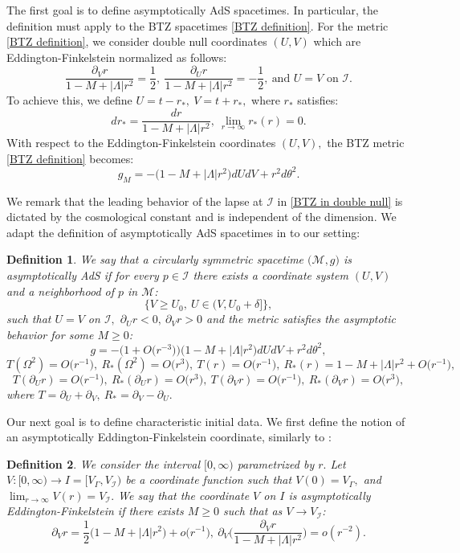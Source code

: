 \documentclass[11pt]{article}
\newtheorem{definition}{Definition}[section]
\numberwithin{equation}{section}
\begin{document}
The first goal is to define asymptotically AdS spacetimes. In particular, the definition must apply to the BTZ spacetimes \eqref{BTZ definition}. For the metric \eqref{BTZ definition}, we consider double null coordinates $(U,V)$ which are Eddington-Finkelstein normalized as follows:
\[\frac{\partial_Vr}{1-M+|\Lambda|r^2}=\frac{1}{2},\ \frac{\partial_Ur}{1-M+|\Lambda|r^2}=-\frac{1}{2},\ \text{and }U=V\text{ on }\mathcal{I}.\]
To achieve this, we define $U=t-r_*,\ V=t+r_*,$ where $r_*$ satisfies:
\[dr_*=\frac{dr}{1-M+|\Lambda|r^2},\ \lim_{r\rightarrow\infty}r_*(r)=0.\]
With respect to the Eddington-Finkelstein coordinates $(U,V),$ the BTZ metric \eqref{BTZ definition} becomes:
\begin{equation}\label{BTZ in double null}
    g_M=-\Big(1-M+|\Lambda|r^2\Big)dUdV+r^2d\theta^2.
\end{equation}

We remark that the leading behavior of the lapse at $\mathcal{I}$ in \eqref{BTZ in double null} is dictated by the cosmological constant and is independent of the dimension. We adapt the definition of asymptotically AdS spacetimes in \cite[Section~2.4]{localwellposed} to our setting:
\begin{definition}\label{asympt ads def}
    We say that a circularly symmetric spacetime $\big(\mathcal{M},g\big)$ is asymptotically AdS if for every $p\in\mathcal{I}$ there exists a coordinate system $(U,V)$ and a neighborhood of $p$ in $\mathcal{M}$:
    \[\Big\{V\geq U_0,\ U\in(V,U_0+\delta]\Big\},\]
    such that $U=V$ on $\mathcal{I},$ $\partial_Ur<0,\ \partial_Vr>0$ and the metric satisfies the asymptotic behavior for some $M\geq0$:
    \[g=-\Big(1+O\big(r^{-3}\big)\Big)\Big(1-M+|\Lambda|r^2\Big)dUdV+r^2d\theta^2,\]
    \[T(\Omega^2)=O\big(r^{-1}\big),\ R_*(\Omega^2)=O\big(r^{3}\big),\ T(r)=O\big(r^{-1}\big),\ R_*(r)=1-M+|\Lambda|r^2+O\big(r^{-1}\big),\]
    \[T(\partial_Ur)=O\big(r^{-1}\big),\ R_*(\partial_Ur)=O\big(r^{3}\big),\ T(\partial_Vr)=O\big(r^{-1}\big),\ R_*(\partial_Vr)=O\big(r^{3}\big),\]
    where $T=\partial_U+\partial_V,\ R_*=\partial_V-\partial_U.$
\end{definition}

Our next goal is to define characteristic initial data. We first define the notion of an asymptotically Eddington-Finkelstein coordinate, similarly to \cite[Proposition~3.1]{localwellposed}:

\begin{definition}
    We consider the interval $[0,\infty)$ parametrized by $r.$ Let $V:[0,\infty)\rightarrow I=\big[V_{\Gamma},V_{\mathcal{I}}\big)$ be a coordinate function such that $V(0)=V_{\Gamma},$ and $\lim_{r\rightarrow\infty}V(r)=V_{\mathcal{I}}.$ We say that the coordinate $V$ on $I$ is asymptotically Eddington-Finkelstein if there exists $M\geq0$ such that as $V\rightarrow V_{\mathcal{I}}$:
     \begin{equation}\label{asympt EF coordinate}
         \partial_Vr=\frac{1}{2}\big(1-M+|\Lambda|r^2\big)+o\big(r^{-1}\big),\ \partial_V\bigg(\frac{\partial_Vr}{1-M+|\Lambda|r^2}\bigg)=o(r^{-2}).
     \end{equation}
\end{definition}
\end{document}
